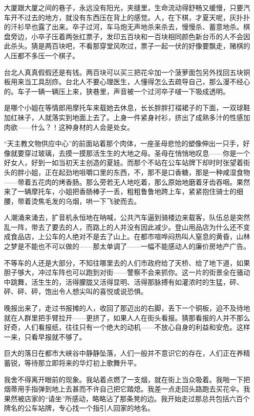 \par 大厦跟大厦之间的巷子，永远没有阳光，夹缝里，生命流动得舒畅又缓慢，只要汽车开不过去的地方，就没有东西压在背上的感觉。人，在下棋，才夏天呢，灰扑扑的汗衫早也露了出来。卒子过河，车马炮无声地杀来杀去，慢慢杀、蓄意地杀。棋盘旁边，小卒子压着两张红票子，发印五百块和一百块相同颜色新台币的人不会因此杀头。猜是两百块吧，不看那穿堂风吹过，票子一起一伏的好像要飘走，赌棋的人压都不多压一个棋子。
\par 台北人真真假假还是有钱。两百块可以买三把花伞加一个菠萝面包另外找回五块铜板用来当工具刮痧。台北人不要心理医生，人懂得怎么去疏导自己，那么漫不经心的。车子一辆一辆压上来，狭巷里，声音被一个过河卒子啵一下吸成透明。
\par 是哪个小姐在等情郎用摩托车来载她去休息，长长胖胖打褶裙子的下面，一双球鞋加红袜子，人就落实到地面上去了。上身一件紧身衬衫，挤出了成熟多汁的性感加肉欲——什么？！这种身材的人会是处女。
\par “天主教文物供应中心”的前面站着那个肉体，一座圣母悲怆的塑像伸出一只手，好像就要穿过玻璃，去摸一摸那活生生的大地之母。圣母在悄悄地叹息——你是一个好女人，好到一如当初天主创造的夏娃。而那个不站在公车站牌下却时时张望着街头的胖小姐，正在起劲地咀嚼口里的东西，不，那不是口香糖，那是一种咸湿食物——带着五花肉的烤香肠。那么旁若无人地吃着，那么原始地磨着牙齿吞咽。果然来了一辆摩托车，小姐把香肠棒子一丢，粗粗鲁鲁地跨上车，紧紧抱住骑士的细腰，带着烫焦毛发的乌烟，哄一下飞驶而去。
\par 人潮涌来涌去，扩音机永恒地在呐喊，公共汽车逼到骑楼边来载客，队伍总是突然乱一阵，带去了要去的人，而路上的人并没有因此减少。登山用品店为什么还不变成食品店，上公车的人绝对不是去了山上。在都市喧哗闷热叫人窒息的黄昏，山林之梦是不能也不可以做的——那太单调了——一幅不能感动人的廉价房地产广告。
\par 不等车的人还是大部分，不知往哪里去的人们市政府给了天桥、给了地下道，如果胆子够大，冲过车阵也可以跑到对街——警察不会来抓你。这一片的街景全在骚动中跳舞，活生生的，活得朦胧又活得显明、活得那脉搏有如灌浓时的生猛，砰、砰、砰、砰，饱出令人想尖叫的喜悦或说恐惧。
\par 晚报出来了，走过书报摊的人，收回了那迈出的右脚，丢下一个铜板，迫不及待地就在人群里把手臂拉开——更挤了，如果人人在街头看报。猜那看报的人并不那么好奇，人们看报纸，往往只有一个绝大的动机——不放心自身的利益和安危。这样一来，只看早报就不够了。
\par 巨大的落日在都市大峡谷中静静坠落，人们一般并不意识它的存在，人们正在养精蓄锐，等待那立即将来的华灯初上歌舞升平。
\par 我舍不得离开眼前的现象。我站着点燃了一支烟，就在街上当众吸着。我啪一下把烟蒂用手指弹到地上去甚而不许自己把它踏熄。我差一点走回头路跑去买花伞。我果然被店家的“请坐”所感动，略略沾了那条凳的边。我开始走过那总共包括六百个牌名的公车站牌，专心找一个指引人回家的地名。
